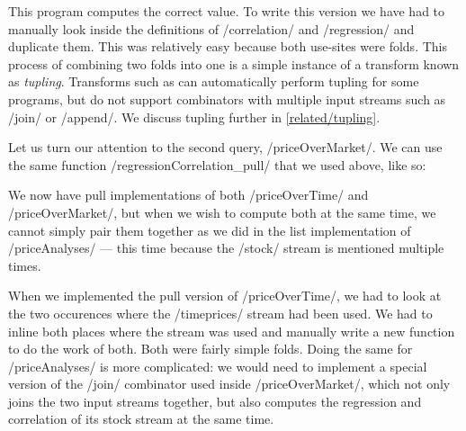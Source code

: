 This program computes the correct value.
To write this version we have had to manually look inside the definitions of \Hs/correlation/ and \Hs/regression/ and duplicate them.
This was relatively easy because both use-sites were folds.
This process of combining two folds into one is a simple instance of a transform known as \emph{tupling}.
Transforms such as \cite{hu1997tupling,hu2005program,chiba2010program} can automatically perform tupling for some programs, but do not support combinators with multiple input streams such as \Hs/join/ or \Hs/append/.
We discuss tupling further in \cref{related/tupling}.



Let us turn our attention to the second query, \Hs/priceOverMarket/.
We can use the same function \Hs/regressionCorrelation_pull/ that we used above, like so:


We now have pull implementations of both \Hs/priceOverTime/ and \Hs/priceOverMarket/, but when we wish to compute both at the same time, we cannot simply pair them together as we did in the list implementation of \Hs/priceAnalyses/ --- this time because the \Hs/stock/ stream is mentioned multiple times.

When we implemented the pull version of \Hs/priceOverTime/, we had to look at the two occurences where the \Hs/timeprices/ stream had been used.
We had to inline both places where the stream was used and manually write a new function to do the work of both.
Both were fairly simple folds.
Doing the same for \Hs/priceAnalyses/ is more complicated: we would need to implement a special version of the \Hs/join/ combinator used inside \Hs/priceOverMarket/, which not only joins the two input streams together, but also computes the regression and correlation of its stock stream at the same time.

